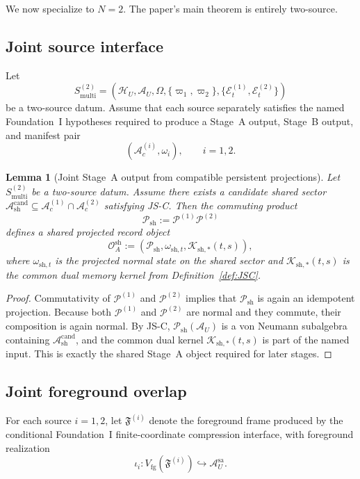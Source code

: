 \documentclass[12pt]{article}
\newtheorem{lemma}[theorem]{Lemma}
\theoremstyle{definition}
\theoremstyle{remark}
\begin{document}
We now specialize to \(N=2\). The paper's main theorem is entirely
two-source.

\subsection{Joint source interface}

Let
\[
S_{\mathrm{multi}}^{(2)}
=
(\mathcal H_U,\mathcal A_U,\Omega,
 \{\varpi_1,\varpi_2\},\{\mathcal E_t^{(1)},\mathcal E_t^{(2)}\})
\]
be a two-source datum. Assume that each source separately satisfies the
named Foundation~I hypotheses required to produce a Stage~A output,
Stage~B output, and manifest pair
\[
(\mathcal A_c^{(i)},\omega_i),
\qquad
i=1,2.
\]

\begin{lemma}[Joint Stage~A output from compatible persistent projections]
\label{lem:jointA}
Let \(S_{\mathrm{multi}}^{(2)}\) be a two-source datum. Assume there
exists a candidate shared sector
\(\mathcal A_{\mathrm{sh}}^{\mathrm{cand}}\subseteq
\mathcal A_c^{(1)}\cap\mathcal A_c^{(2)}\) satisfying JS-C. Then the
commuting product
\[
\mathcal P_{\mathrm{sh}}
:=
\mathcal P^{(1)}\mathcal P^{(2)}
\]
defines a shared projected record object
\[
\mathcal O_A^{\mathrm{sh}}
:=
(\mathcal P_{\mathrm{sh}},\omega_{\mathrm{sh},t},\mathcal K_{\mathrm{sh},*}(t,s)),
\]
where \(\omega_{\mathrm{sh},t}\) is the projected normal state on the
shared sector and \(\mathcal K_{\mathrm{sh},*}(t,s)\) is the common dual
memory kernel from Definition~\ref{def:JSC}.
\end{lemma}

\begin{proof}
Commutativity of \(\mathcal P^{(1)}\) and \(\mathcal P^{(2)}\) implies
that \(\mathcal P_{\mathrm{sh}}\) is again an idempotent projection.
Because both \(\mathcal P^{(1)}\) and \(\mathcal P^{(2)}\) are normal
and they commute, their composition is again normal. By JS-C,
\(\mathcal P_{\mathrm{sh}}(\mathcal A_U)\) is a von Neumann subalgebra
containing \(\mathcal A_{\mathrm{sh}}^{\mathrm{cand}}\), and the common
dual kernel \(\mathcal K_{\mathrm{sh},*}(t,s)\) is part of the named
input. This is exactly the shared Stage~A object required for later
stages.
\end{proof}

\subsection{Joint foreground overlap}

For each source \(i=1,2\), let
\(\mathfrak F^{(i)}\) denote the foreground frame produced by the
conditional Foundation~I finite-coordinate compression interface, with foreground realization
\[
\iota_i:V_{\mathrm{fg}}(\mathfrak F^{(i)})\hookrightarrow
\mathcal A_U^{\mathrm{sa}}.
\]
\end{document}
